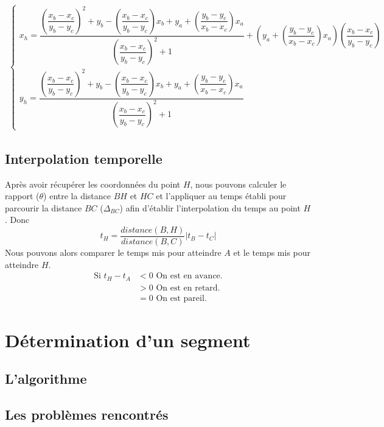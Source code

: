 \begin{align}
	\begin{cases}
		 x_h = \dfrac{\left( \dfrac{x_b - x_c}{y_b - y_c}\right)^2 + y_b - \left( \dfrac{x_b - x_c}{y_b - y_c}\right) x_b + y_a + \left( \dfrac{y_b - y_c}{x_b - x_c}\right) x_a}{\left( \dfrac{x_b - x_c}{y_b - y_c}\right)^2 + 1} + \left( y_a + \left( \dfrac{y_b - y_c}{x_b - x_c}\right) x_a\right) \left( \dfrac{x_b - x_c}{y_b - y_c}\right)  \\
    	 y_h = \dfrac{\left( \dfrac{x_b - x_c}{y_b - y_c}\right)^2 + y_b - \left( \dfrac{x_b - x_c}{y_b - y_c}\right) x_b + y_a + \left( \dfrac{y_b - y_c}{x_b - x_c}\right) x_a}{\left( \dfrac{x_b - x_c}{y_b - y_c}\right)^2 + 1}
	\end{cases}
\end{align}

\subsection{Interpolation temporelle}
Après avoir récupérer les coordonnées du point $H$, nous pouvons calculer le rapport ($\theta$) entre la distance $BH$ et $HC$ et l'appliquer au temps établi pour parcourir la distance $BC$ ($\Delta_{BC}$) afin d'établir l'interpolation du temps au point $H$. Donc
\[
	t_H = \frac{distance(B,H)}{distance(B,C)}| t_B - t_C | 
\]
Nous pouvons alors comparer le temps mis pour atteindre $A$ et le temps mis pour atteindre $H$.
\begin{align}
\mbox{Si } t_H - t_A &<0 \mbox{ On est en avance.} \\
			&>0 \mbox{ On est en retard.} \\
			&=0 \mbox{ On est pareil.}
\end{align}

\section{Détermination d'un segment}
\subsection{L'algorithme}
\subsection{Les problèmes rencontrés}
